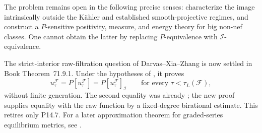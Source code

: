 \documentclass[11pt,a4paper]{article}
\theoremstyle{definition}
\theoremstyle{remark}
\begin{document}
The problem remains open in the following precise senses: characterize the
image intrinsically outside the K\"ahler and established smooth-projective
regimes, and construct a \(P\)-sensitive positivity, measure, and energy
theory for big non-nef classes.  One cannot obtain the latter by replacing
\(P\)-equivalence with \(\mathcal I\)-equivalence.

The strict-interior raw-filtration question of Darvas--Xia--Zhang is now
settled in Book Theorem~71.9.1.  Under the hypotheses of
\cite[Definition~4.1]{DXZ23}, it proves
\[
 u_\tau^{\mathcal F}
 =P[u_\tau^{\mathcal F}]
 =P[u_\tau^{\mathcal F}]_{\mathcal I}
 \qquad\text{for every }\tau<\tau_L(\mathcal F),
\]
without finite generation.  The second equality was already
\cite[Lemma~4.5]{DXZ23}; the new proof supplies equality with the raw
function by a fixed-degree birational estimate.  This retires only P14.7.
For a later approximation theorem for graded-series equilibrium metrics,
see \cite[Theorem~4.3]{Finski26Kodaira}.
\end{document}
